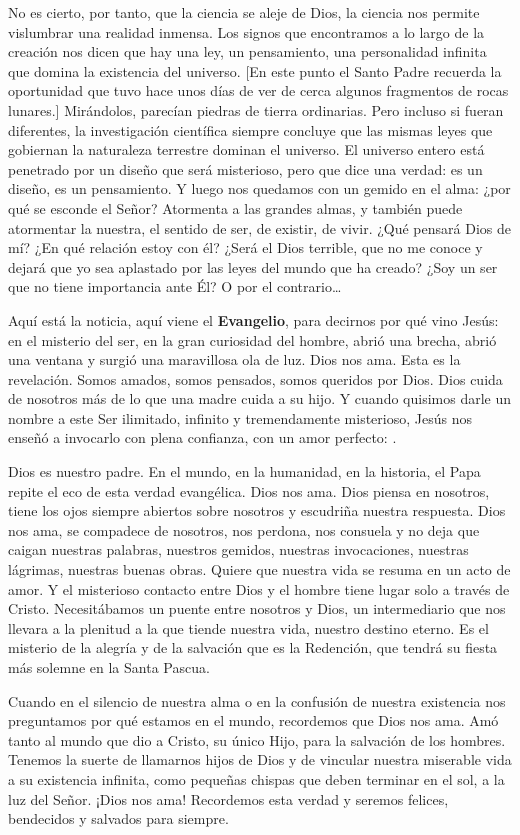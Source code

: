 \begin{body}
No es cierto, por tanto, que la ciencia se aleje de Dios, la ciencia nos permite vislumbrar una realidad inmensa. Los signos que encontramos a lo largo de la creación nos dicen que hay una ley, un pensamiento, una personalidad infinita que domina la existencia del universo. [En este punto el Santo Padre recuerda la oportunidad que tuvo hace unos días de ver de cerca algunos fragmentos de rocas lunares.] Mirándolos, parecían piedras de tierra ordinarias. Pero incluso si fueran diferentes, la investigación científica siempre concluye que las mismas leyes que gobiernan la naturaleza terrestre dominan el universo. El universo entero está penetrado por un diseño que será misterioso, pero que dice una verdad: es un diseño, es un pensamiento. Y luego nos quedamos con un gemido en el alma: ¿por qué se esconde el Señor? Atormenta a las grandes almas, y también puede atormentar la nuestra, el sentido de ser, de existir, de vivir. ¿Qué pensará Dios de mí? ¿En qué relación estoy con él? ¿Será el Dios terrible, que no me conoce y dejará que yo sea aplastado por las leyes del mundo que ha creado? ¿Soy un ser que no tiene importancia ante Él? O por el contrario\ldots

Aquí está la noticia, aquí viene el \textbf{Evangelio}, para decirnos por qué vino Jesús: en el misterio del ser, en la gran curiosidad del hombre, abrió una brecha, abrió una ventana y surgió una maravillosa ola de luz. Dios nos ama. Esta es la revelación. Somos amados, somos pensados, somos queridos por Dios. Dios cuida de nosotros más de lo que una madre cuida a su hijo. Y cuando quisimos darle un nombre a este Ser ilimitado, infinito y tremendamente misterioso, Jesús nos enseñó a invocarlo con plena confianza, con un amor perfecto: .

Dios es nuestro padre. En el mundo, en la humanidad, en la historia, el Papa repite el eco de esta verdad evangélica. Dios nos ama. Dios piensa en nosotros, tiene los ojos siempre abiertos sobre nosotros y escudriña nuestra respuesta. Dios nos ama, se compadece de nosotros, nos perdona, nos consuela y no deja que caigan nuestras palabras, nuestros gemidos, nuestras invocaciones, nuestras lágrimas, nuestras buenas obras. Quiere que nuestra vida se resuma en un acto de amor. Y el misterioso contacto entre Dios y el hombre tiene lugar solo a través de Cristo. Necesitábamos un puente entre nosotros y Dios, un intermediario que nos llevara a la plenitud a la que tiende nuestra vida, nuestro destino eterno. Es el misterio de la alegría y de la salvación que es la Redención, que tendrá su fiesta más solemne en la Santa Pascua.

Cuando en el silencio de nuestra alma o en la confusión de nuestra existencia nos preguntamos por qué estamos en el mundo, recordemos que Dios nos ama. Amó tanto al mundo que dio a Cristo, su único Hijo, para la salvación de los hombres. Tenemos la suerte de llamarnos hijos de Dios y de vincular nuestra miserable vida a su existencia infinita, como pequeñas chispas que deben terminar en el sol, a la luz del Señor. ¡Dios nos ama! Recordemos esta verdad y seremos felices, bendecidos y salvados para siempre.
\end{body}



